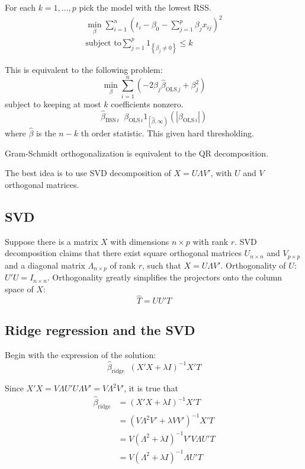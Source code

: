 \documentclass[a4paper]{article}
\newcommand{\obj}[1]{{\left\{ #1 \right \}}}
\newcommand{\clop}[1]{{\left [ #1 \right )}}
\newcommand{\brac}[1]{{\left ( #1 \right )}}
\newcommand{\abs}[1]{{\left | #1 \right |}}
\newcommand{\defn}{\mathop{\overset{\Delta}{=}}\nolimits}
\begin{document}
For each $k = 1,\ldots, p$ pick the model with the lowest RSS.
\begin{align*}
\min_{\beta} \sum_{i=1}^n \brac{t_i - \beta_0 - \sum_{j=1}^p \beta_j x_{ij}}^2 \\
\text{subject to} \sum_{j=1}^p 1_\obj{\beta_j\neq 0} \leq k
\end{align*}

This is equivalent to the following problem:
\[\min_{\beta} \sum_{i=1}^n \brac{ - 2 \beta_j \hat{\beta}_{\text{OLS}\,j} + \beta_j^2 }\]
subject to keeping at most $k$ coefficients nonzero.
\[\hat{\beta}_{\text{BSS}\,i} \defn \beta_{\text{OLS}\,i} 1_{\clop{\hat{\beta}, \infty}}\brac{ \abs{\beta_{\text{OLS}\,i}} }\]
where $\hat{\beta}$ is the $n-k$ th order statistic. This given hard thresholding.

Gram-Schmidt orthogonalization is equivalent to the QR decomposition.

The best idea is to use SVD decomposition of $X = U\Lambda V'$, with $U$ and $V$ orthogonal matrices.


\subsection*{SVD} %
\label{sub:svd}

Suppose there is a matrix $X$ with dimensions $n\times p$ with rank $r$.
SVD decomposition claims that there exist square orthogonal matrices $U_{n\times n}$ and $V_{p\times p}$
and a diagonal matrix $\Lambda_{n\times p}$ of rank $r$, such that $X = U \Lambda V'$.
Orthogonality of $U$: $U'U = I_{n\times n}$. Orthogonality greatly simplifies the projectors onto the column space of $X$: 
\[\hat{T} = U U' T\]


\subsection*{Ridge regression and the SVD} %
\label{sub:ridge_regression_and_the_svd}

Begin with the expression of the solution:
\[\hat{\beta}_{\text{ridge}} \defn \brac{X'X + \lambda I}^{-1} X'T\]

Since $X'X = V\Lambda U' U \Lambda V' = V\Lambda^2 V'$, it is true that 
\begin{align*}
	\hat{\beta}_{\text{ridge}} & = \brac{X'X + \lambda I}^{-1} X'T\\
	& = \brac{V\Lambda^2 V' + \lambda VV'}^{-1} X'T\\
	& = V \brac{\Lambda^2 + \lambda I}^{-1} V' V\Lambda U' T \\
	& = V \brac{\Lambda^2 + \lambda I}^{-1} \Lambda U' T
\end{align*}
\end{document}
